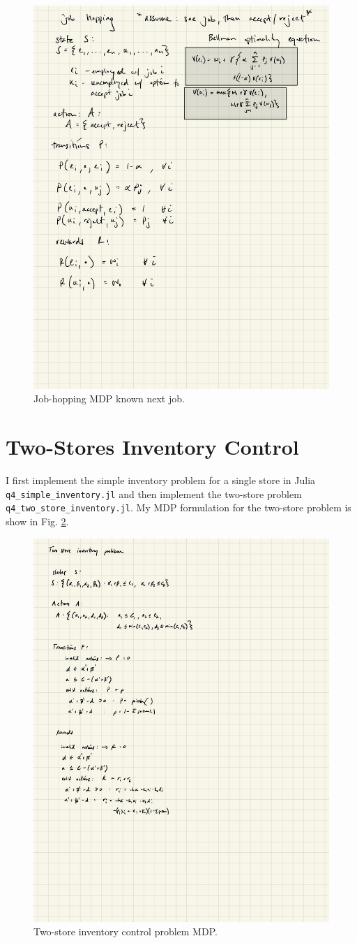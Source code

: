 \documentclass[12pt]{article}
\begin{document}
\begin{figure}[h]
	\centering
	\includegraphics[width=.75\textwidth]{ipad/q3_2.jpg}
	\caption{Job-hopping MDP known next job.}
	\label{fig:q3_2}
\end{figure}

\section{Two-Stores Inventory Control}

I first implement the simple inventory problem for a single store in Julia \texttt{q4\_simple\_inventory.jl} and then implement the two-store problem \texttt{q4\_two\_store\_inventory.jl}. My MDP formulation for the two-store problem is show in Fig. \ref{fig:q4}.

\begin{figure}[h]
	\centering
	\includegraphics[width=.75\textwidth]{ipad/q4.jpg}
	\caption{Two-store inventory control problem MDP.}
	\label{fig:q4}
\end{figure}


\clearpage
\end{document}
